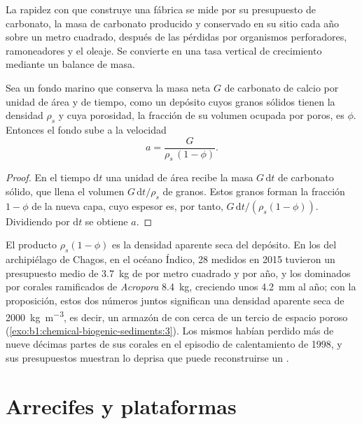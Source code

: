 La rapidez con que construye una fábrica se mide por su presupuesto de carbonato, la masa de carbonato producido y conservado en su sitio cada año sobre un metro cuadrado, después de las
pérdidas por organismos perforadores, ramoneadores y el oleaje. Se convierte en una tasa vertical de crecimiento mediante un balance de masa.

\begin{proposition}\label{prop:b1:chemical-biogenic-sediments:accretion}
Sea un fondo marino que conserva la masa neta $G$ de carbonato de calcio por unidad de área y de tiempo, como un depósito cuyos granos sólidos tienen la densidad $\rho_s$
y cuya porosidad, la fracción de su volumen ocupada por poros, es $\phi$. Entonces el fondo sube a la velocidad
\[
a = \frac{G}{\rho_s\,(1-\phi)}.
\]
\end{proposition}

\begin{proof}
En el tiempo $\mathrm dt$ una unidad de área recibe la masa $G\,\mathrm dt$ de carbonato sólido, que llena el volumen $G\,\mathrm dt/\rho_s$ de granos. Estos granos
forman la fracción $1-\phi$ de la nueva capa, cuyo espesor es, por tanto, $G\,\mathrm dt/(\rho_s(1-\phi))$. Dividiendo por $\mathrm dt$ se obtiene $a$.
\end{proof}

El producto $\rho_s(1-\phi)$ es la densidad aparente seca del depósito. En los  del archipiélago de Chagos, en el océano Índico, 28  medidos en 2015 tuvieron un presupuesto
medio de \qty{3.7}{kg} de  por metro cuadrado y por año, y los dominados por corales ramificados de \emph{Acropora} \qty{8.4}{kg}, creciendo unos \qty{4.2}{mm} al año; con la proposición,
estos dos números juntos significan una densidad aparente seca de \qty{2000}{kg.m^{-3}}, es decir, un armazón de  con cerca de un tercio de espacio poroso
(\cref{exo:b1:chemical-biogenic-sediments:3}). Los mismos  habían perdido más de nueve décimas partes de sus corales en el episodio de calentamiento de 1998, y sus presupuestos
muestran lo deprisa que puede reconstruirse un .

\section{Arrecifes y plataformas}\label{sec:b1:chemical-biogenic-sediments:reefs}

